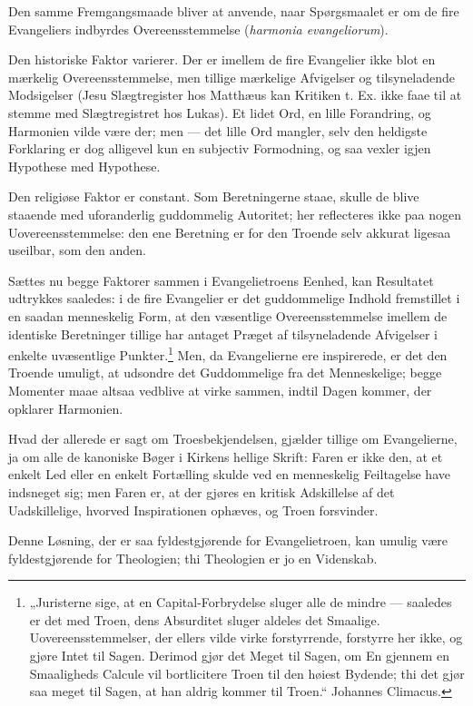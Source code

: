 \documentclass[12pt,a4paper]{book}
\newcommand{\opage}[1]{\marginnote{\footnotesize\textit{[#1]}}}
\begin{document}
Den samme Fremgangsmaade bliver at anvende, naar Spørgsmaalet er om de fire
Evangeliers indbyrdes Overeensstemmelse (\textit{harmonia evangeliorum}).

Den historiske Faktor varierer. Der er imellem de fire Evangelier ikke blot en
mærkelig Overeensstemmelse, men tillige mærkelige Afvigelser og tilsyneladende
Modsigelser (Jesu Slægtregister hos Matthæus kan Kritiken t. Ex. ikke faae til
at stemme med Slægtregistret hos Lukas). Et lidet Ord, en lille Forandring, og
Harmonien vilde være der; men --- det lille Ord mangler, selv den heldigste
Forklaring er dog alligevel kun en subjectiv Formodning, og saa vexler igjen
Hypothese med Hypothese.

Den religiøse Faktor er constant. Som Beretningerne staae, skulle de blive
staaende med uforanderlig guddommelig Autoritet; her reflecteres ikke paa nogen
Uovereensstemmelse: den ene Beretning er for den Troende selv akkurat ligesaa
useilbar, som den anden.

Sættes nu begge Faktorer sammen i Evangelietroens Eenhed, kan Resultatet
udtrykkes saaledes: i de fire Evangelier er det guddommelige Indhold fremstillet
i en saadan menneskelig Form, at den væsentlige Overeensstemmelse imellem de
identiske Beretninger tillige har antaget Præget af tilsyneladende Afvigelser i
\opage{46} enkelte uvæsentlige Punkter.\footnote{„Juristerne sige, at en
Capital-Forbrydelse sluger alle de mindre --- saaledes er det med Troen, dens
Absurditet sluger aldeles det Smaalige. Uovereensstemmelser, der ellers vilde
virke forstyrrende, forstyrre her ikke, og gjøre Intet til Sagen. Derimod gjør
det Meget til Sagen, om En gjennem en Smaaligheds Calcule vil bortlicitere
Troen til den høiest Bydende; thi det gjør saa meget til Sagen, at han aldrig
kommer til Troen.“ Johannes Climacus.} Men, da Evangelierne ere inspirerede, er
det den Troende umuligt, at udsondre det Guddommelige fra det Menneskelige;
begge Momenter maae altsaa vedblive at virke sammen, indtil Dagen kommer, der
opklarer Harmonien.

Hvad der allerede er sagt om Troesbekjendelsen, gjælder tillige om
Evangelierne, ja om alle de kanoniske Bøger i Kirkens hellige Skrift: Faren er
ikke den, at et enkelt Led eller en enkelt Fortælling skulde ved en menneskelig
Feiltagelse have indsneget sig; men Faren er, at der gjøres en kritisk
Adskillelse af det Uadskillelige, hvorved Inspirationen ophæves, og Troen
forsvinder.

Denne Løsning, der er saa fyldestgjørende for Evangelietroen, kan umulig være
fyldestgjørende for Theologien; thi Theologien er jo en Videnskab.
\end{document}
